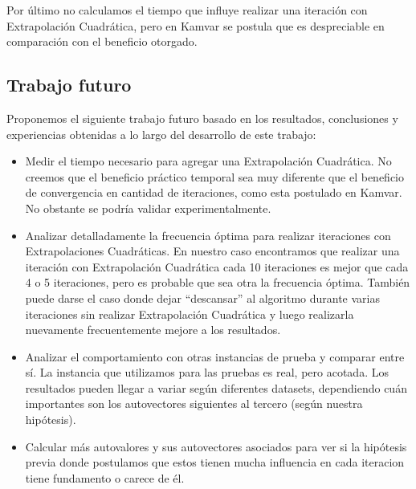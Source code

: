 Por último no calculamos el tiempo que influye realizar una iteración con
Extrapolación Cuadrática, pero en Kamvar se postula que es despreciable en
comparación con el beneficio otorgado.

\subsection{Trabajo futuro}

Proponemos el siguiente trabajo futuro basado en los resultados, conclusiones y
experiencias obtenidas a lo largo del desarrollo de este trabajo:

\begin{itemize}

\item Medir el tiempo necesario para agregar una Extrapolación Cuadrática. No
creemos que el beneficio práctico temporal sea muy diferente que el beneficio
de convergencia en cantidad de iteraciones, como esta postulado en Kamvar.
No obstante se podría validar experimentalmente.

\item Analizar detalladamente la frecuencia óptima para realizar iteraciones
con Extrapolaciones Cuadráticas. En nuestro caso encontramos que realizar una
iteración con Extrapolación Cuadrática cada 10 iteraciones es mejor que cada 4
o 5 iteraciones, pero es probable que sea otra la frecuencia óptima. También
puede darse el caso donde dejar ``descansar'' al algoritmo durante varias
iteraciones sin realizar Extrapolación Cuadrática y luego realizarla nuevamente
frecuentemente mejore a los resultados.

\item Analizar el comportamiento con otras instancias de prueba y comparar
entre sí. La instancia que utilizamos para las pruebas es real, pero acotada.
Los resultados pueden llegar a variar según diferentes datasets, dependiendo
cuán importantes son los autovectores siguientes al tercero (según nuestra
hipótesis).

\item Calcular más autovalores y sus autovectores asociados para ver si la
hipótesis previa donde postulamos que estos tienen mucha influencia en cada
iteracion tiene fundamento o carece de él.

\end{itemize}
